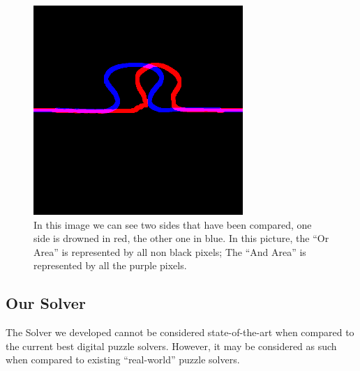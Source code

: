 \documentclass{article}
\begin{document}
\begin{figure}[htbp]
  \centering
  \begin{minipage}[t]{0.44\textwidth}
    \vspace{3pt} %
    \includegraphics[width=\textwidth]{pictures/side_comparation.png}
  \end{minipage}
  \hfill
  \begin{minipage}[t]{0.54\textwidth}
    \caption{\newline
    In this image we can see two sides that have been
    compared, one side is drowned in red, the other one in blue.
    In this picture, the “Or Area” is represented by all non
    black pixels; The “And Area” is represented by all the
    purple pixels.}
  \end{minipage}
\end{figure}
\clearpage



\subsection{Our Solver}\label{document:my_solver}
The Solver we developed cannot be considered state-of-the-art when compared
to the current best digital puzzle solvers. However, it may be
considered as such when compared to existing ``real-world'' puzzle solvers.
\end{document}
